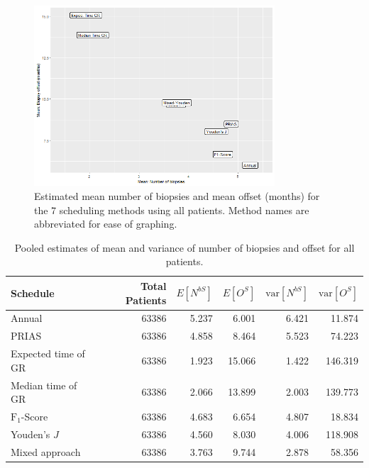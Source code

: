 \begin{figure}[!htb]
	\centering
    \captionsetup{justification=centering}
	\includegraphics[width=0.8\textwidth]{images/sim_study/meanNbVsOffset_all.png}
	\caption{Estimated mean number of biopsies and mean offset (months) for the 7 scheduling methods using all patients. Method names are abbreviated for ease of graphing.}
	\label{fig : meanNbVsOffset}
\end{figure}

\begin{table}[!htb]
\centering
\captionsetup{justification=centering}
\caption{Pooled estimates of mean and variance of number of biopsies and offset for all patients.}
\label{table : sim_study_pooled_estimates}
\begin{tabular}{@{}lrrrrr@{}}
\toprule
Schedule           & Total Patients & $E[N^{bS}]$ & $E[O^{S}]$ & $\mbox{var}[N^{bS}]$ & $\mbox{var}[O^S]$ \\ \midrule
Annual              & 63386                  & 5.237           & 6.001               & 6.421          & 11.874             \\
PRIAS              & 63386                  & 4.858           & 8.464               & 5.523          & 74.223             \\
Expected time of GR & 63386                  & 1.923           & 15.066              & 1.422          & 146.319            \\
Median time of GR  & 63386                  & 2.066           & 13.899              & 2.003          & 139.773            \\
$\text{F}_1$-Score           & 63386                  & 4.683           & 6.654               & 4.807          & 18.834             \\
Youden's $J$             & 63386                  & 4.560            & 8.030                & 4.006          & 118.908            \\
Mixed approach     & 63386                  & 3.763           & 9.744               & 2.878          & 58.356             \\ \bottomrule
\end{tabular}
\end{table}

